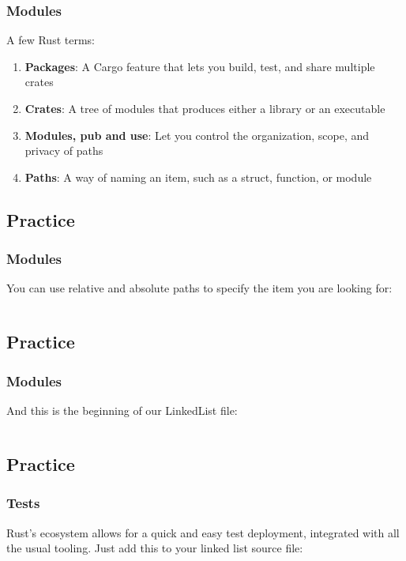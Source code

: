 \documentclass[usenames,twocolumn,dvipsnames,10pt,a4wide]{article}
\begin{document}
	\subsubsection{Modules}	
	\large
	A few Rust terms:
	\begin{enumerate}
		\item \textbf{Packages}: A Cargo feature that lets
			you build, test, and share multiple crates
		\item \textbf{Crates}: A tree of modules that 
			produces either a library or an executable
		\item \textbf{Modules, pub and use}: Let you control the organization, scope, and privacy of paths
		\item \textbf{Paths}: A way of naming an item, such as a struct, function, or module
	\end{enumerate}


\subsection{Practice}
	\subsubsection{Modules}
	\large
	You can use relative and absolute paths to
	specify the item you are looking for:
	
	\inputminted[fontsize=\normalsize]{rust}{code/modules.rs}


\subsection{Practice}
	\subsubsection{Modules}
	\large
	And this is the beginning of our LinkedList file:
	
	\inputminted[fontsize=\normalsize]{rust}{code/list11.rs}


\subsection{Practice}
	\subsubsection{Tests}
	\large
	Rust's ecosystem allows for a quick and easy test
	deployment, integrated with all the usual tooling.
	Just add this to your linked list source file:
	
\end{document}
